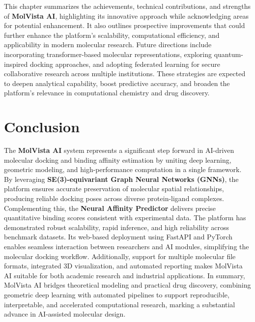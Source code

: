 \documentclass[12pt,a4]{report}
\begin{document}
\hspace{0.3in}This chapter summarizes the achievements, technical contributions, and strengths of \textbf{MolVista AI}, highlighting its innovative approach while acknowledging areas for potential enhancement. It also outlines prospective improvements that could further enhance the platform’s scalability, computational efficiency, and applicability in modern molecular research. Future directions include incorporating transformer-based molecular representations, exploring quantum-inspired docking approaches, and adopting federated learning for secure collaborative research across multiple institutions. These strategies are expected to deepen analytical capability, boost predictive accuracy, and broaden the platform’s relevance in computational chemistry and drug discovery.\\

\section{Conclusion}
\vspace{0.2cm}
\hspace{0.3in}The \textbf{MolVista AI} system represents a significant step forward in AI-driven molecular docking and binding affinity estimation by uniting deep learning, geometric modeling, and high-performance computation in a single framework. By leveraging \textbf{SE(3)-equivariant Graph Neural Networks (GNNs)}, the platform ensures accurate preservation of molecular spatial relationships, producing reliable docking poses across diverse protein-ligand complexes. Complementing this, the \textbf{Neural Affinity Predictor} delivers precise quantitative binding scores consistent with experimental data. The platform has demonstrated robust scalability, rapid inference, and high reliability across benchmark datasets. Its web-based deployment using FastAPI and PyTorch enables seamless interaction between researchers and AI modules, simplifying the molecular docking workflow. Additionally, support for multiple molecular file formats, integrated 3D visualization, and automated reporting makes MolVista AI suitable for both academic research and industrial applications. In summary, MolVista AI bridges theoretical modeling and practical drug discovery, combining geometric deep learning with automated pipelines to support reproducible, interpretable, and accelerated computational research, marking a substantial advance in AI-assisted molecular design.

\vspace{0.3cm}
\end{document}
